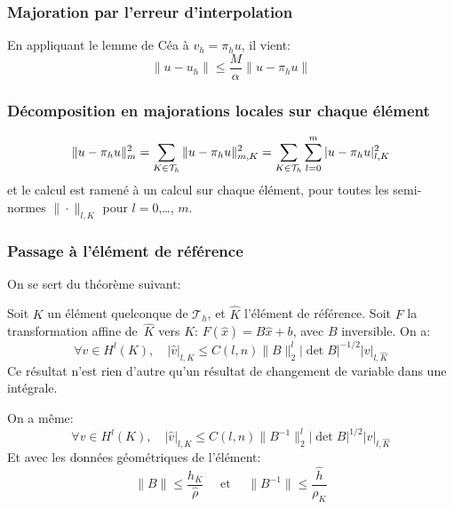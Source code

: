 \subsubsection{Majoration par l'erreur d'interpolation}

En appliquant le lemme de Céa à $v_h=\pi_hu$, il vient:
\begin{equation}
\|u-u_h\|\le\dfrac{M}{\alpha}\|u-\pi_hu\|
\end{equation}

\medskip
\subsubsection{Décomposition en majorations locales sur chaque élément}

\begin{equation}
\|u-\pi_hu\|^2_m=\displaystyle\sum_{K\in\mathcal{T}_h}\|u-\pi_hu\|^2_{m,K}=\displaystyle\sum_{K\in\mathcal{T}_h}\displaystyle\sum_{l=0}^m |u-\pi_hu|^2_{l,K}
\end{equation}
et le calcul est ramené à un calcul sur chaque élément, pour toutes les semi-normes
$\|\cdot\|_{l,K}$ pour $l=0$,\ldots, $m$.

\medskip
\subsubsection{Passage à l'élément de référence}

On se sert du théorème suivant:

\begin{theoreme}
Soit $K$ un élément quelconque de $\mathcal{T}_h$, et $\hat{K}$ l'élément de
référence. Soit $F$ la transformation affine de~$\hat{K}$ vers $K$:
$F(\hat{x}) = B\hat{x} + b$, avec $B$ inversible. On a:
\begin{equation}
\forall v\in H^l(K), \quad
|\hat{v}|_{l,K} \le C(l,n) \|B\|_2^l |\det B|^{-1/2} |v|_{l,\hat{K}}
\end{equation}
Ce résultat n'est rien d'autre qu'un résultat de changement de variable
dans une intégrale.
\end{theoreme}
On a même:
\begin{equation}
\forall v\in H^l(K), \quad
|\hat{v}|_{l,K} \le C(l,n) \|B^{-1}\|_2^l |\det B|^{1/2} |v|_{l,\hat{K}}
\end{equation}
\medskip
%
Et avec les données géométriques de l'élément:
\begin{equation}
\|B\|\le\dfrac{h_K}{\hat{\rho}} \quad\text{ et }\quad
\|B^{-1}\|\le\dfrac{\hat{h}}{\rho_K}
\end{equation}

